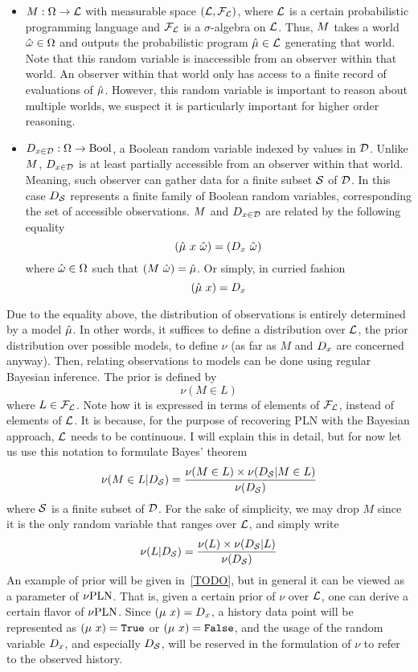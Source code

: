 \documentclass[]{article}
\begin{document}
\begin{itemize}
\item $M : \Omega \to \mathcal{L}$ with measurable space
  $(\mathcal{L}, \mathcal{F}_{\mathcal{L}})$, where $\mathcal{L}$ is a certain
  probabilistic programming language and $\mathcal{F}_{\mathcal{L}}$ is a
  $\sigma$-algebra on $\mathcal{L}$.  Thus, $M$ takes a world
  $\hat{\omega} \in \Omega$ and outputs the probabilistic program $\hat{\mu}
  \in \mathcal{L}$ generating that world.  Note that this random
  variable is inaccessible from an observer within that world.  An
  observer within that world only has access to a finite record of
  evaluations of $\hat{\mu}$.  However, this random variable is important
  to reason about multiple worlds, we suspect it is particularly
  important for higher order reasoning.
\item $D_{x\in\mathcal{D}} : \Omega \to \textup{Bool}$, a Boolean random variable indexed
  by values in $\mathcal{D}$.  Unlike $M$, $D_{x\in\mathcal{D}}$ is at least
  partially accessible from an observer within that world.  Meaning,
  such observer can gather data for a finite subset $\mathcal{S}$ of
  $\mathcal{D}$.  In this case $D_{\mathcal{S}}$ represents a finite family of
  Boolean random variables, corresponding the set of accessible
  observations.  $M$ and $D_{x\in\mathcal{D}}$ are related by the following
  equality
  $$(\anymu\ x\ \anyomega) = (\Datax\ \anyomega)$$ where $\hat{\omega}
  \in \Omega$ such that $(M\ \hat{\omega}) = \hat{\mu}$.  Or simply, in
  curried fashion
  $$(\hat{\mu}\ x) = D_x$$
\end{itemize}
Due to the equality above, the distribution of observations is
entirely determined by a model $\hat{\mu}$.  In other words, it suffices
to define a distribution over $\mathcal{L}$, the prior distribution over
possible models, to define $\nu$ (as far as $M$ and $D_x$ are
concerned anyway).  Then, relating observations to models can be done
using regular Bayesian inference.  The prior is defined by
$$\nu(M \in L)$$ where $L \in \mathcal{F}_{\mathcal{L}}$.  Note how it is
expressed in terms of elements of $\mathcal{F}_{\mathcal{L}}$, instead of
elements of $\mathcal{L}$.  It is because, for the purpose of recovering
PLN with the Bayesian approach, $\mathcal{L}$ needs to be continuous.  I
will explain this in detail, but for now let us use this notation to
formulate Bayes' theorem
$$\nu(M \in L | D_{\mathcal{S}}) = \frac{\nu(M \in L) \times \nu(D_{\mathcal{S}} | M \in
  L)}{\nu(D_{\mathcal{S}})}$$ where $\mathcal{S}$ is a finite subset of
$\mathcal{D}$.  For the sake of simplicity, we may drop $M$ since it is
the only random variable that ranges over $\mathcal{L}$, and simply
write
$$\nu(L | D_{\mathcal{S}}) = \frac{\nu(L) \times \nu(D_{\mathcal{S}} |
  L)}{\nu(D_{\mathcal{S}})}$$
An example of prior will be given in~\ref{TODO},
but in general it can be viewed as a parameter of $\nu\textup{PLN}$.  That is,
given a certain prior of $\nu$ over $\mathcal{L}$, one can derive a
certain flavor of $\nu\textup{PLN}$.  Since $(\mu\ x) = D_x$, a history data
point will be represented as $(\mu\ x) = \texttt{True}$ or $(\mu\ x) = \texttt{False}$, and
the usage of the random variable $D_x$, and especially $D_{\mathcal{S}}$,
will be reserved in the formulation of $\nu$ to refer to the observed
history.
\end{document}
